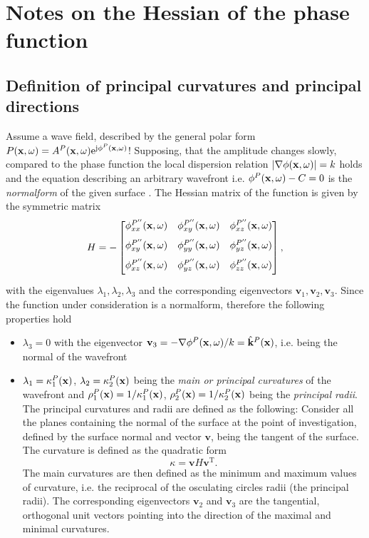 \section{Notes on the Hessian of the phase function}
\label{App:Hessian}

\subsection{Definition of principal curvatures and principal directions}
Assume a wave field, described by the general polar form $P(\mathbf{x},\omega) = A^P(\mathbf{x},\omega)\mathrm{e}^{\mathrm{j} \phi^P (\mathbf{x},\omega)}$!
Supposing, that the amplitude changes slowly, compared to the phase function the local dispersion relation $| \nabla \phi(\mathbf{x},\omega) |= k$ holds and the equation describing an arbitrary wavefront i.e. $\phi^P(\mathbf{x},\omega) - C = 0$ is the \emph{normalform} of the given surface \cite{Hartmann1999}.
The Hessian matrix of the function is given by the symmetric matrix 
\begin{equation}
H = - \begin{bmatrix} 
\phi^{P''}_{xx}(\mathbf{x},\omega) & \phi^{P''}_{xy}(\mathbf{x},\omega) & \phi^{P''}_{xz}(\mathbf{x},\omega) \\[.7em]
\phi^{P''}_{xy}(\mathbf{x},\omega) & \phi^{P''}_{yy}(\mathbf{x},\omega) & \phi^{P''}_{yz}(\mathbf{x},\omega) \\[.7em]
\phi^{P''}_{xz}(\mathbf{x},\omega) & \phi^{P''}_{yz}(\mathbf{x},\omega) & \phi^{P''}_{zz}(\mathbf{x},\omega) \\[0.5em]    \end{bmatrix},
\end{equation}
with the eigenvalues $\lambda_1, \lambda_2, \lambda_3$ and the corresponding eigenvectors $\mathbf{v}_1, \mathbf{v}_2, \mathbf{v}_3$.
Since the function under consideration is a normalform, therefore the following properties hold
\begin{itemize}
\item $\lambda_3 = 0$ with the eigenvector $\mathbf{v}_3 = - \nabla \phi^P(\mathbf{x},\omega) /k = \hat{\mathbf{k}}^P(\mathbf{x})$, i.e. being the normal of the wavefront
\item $\lambda_1 = \kappa^P_1(\mathbf{x})$, $\lambda_2 = \kappa^P_2(\mathbf{x})$ being the \emph{main or principal curvatures} of the wavefront and $\rho^P_1(\mathbf{x}) = 1/\kappa^P_1(\mathbf{x})$, $\rho^P_2(\mathbf{x}) = 1/\kappa^P_2(\mathbf{x})$ being the \emph{principal radii}.
The principal curvatures and radii are defined as the following:
Consider all the planes containing the normal of the surface at the point of investigation, defined by the surface normal and vector $\mathbf{v}$, being the tangent of the surface.
The curvature is defined as the quadratic form 
\begin{equation}
\kappa = \mathbf{v} H \mathbf{v}^{\mathrm{T}}.
\label{Eq:App:curvature_def}
\end{equation}
The main curvatures are then defined as the minimum and maximum values of curvature, i.e. the reciprocal of the osculating circles radii (the principal radii).
The corresponding eigenvectors $\mathbf{v}_2$ and $\mathbf{v}_3$ are the tangential, orthogonal unit vectors pointing into the direction of the maximal and minimal curvatures.
\end{itemize}

